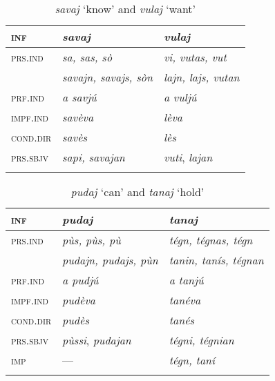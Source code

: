 \begin{table}
	\caption{\textit{savaj} `know' and \textit{vulaj} `want'}
	\label{}
	\begin{tabular}{lll}
		\lsptoprule
		\textsc{inf} & \textbf{\textit{savaj}} & \textbf{\textit{vulaj}} \\
		\midrule
		\textsc{prs.ind} & \textit{sa, sas, sò} & \textit{vi, vutas, vut} \\
		& \textit{savajn, savajs, sòn} & \textit{lajn, lajs, vutan} \\
		\textsc{prf.ind} & \textit{a savjú} & \textit{a vuljú}\\
		\textsc{impf.ind} & \textit{savèva} & \textit{lèva}\\
		\textsc{cond.dir} & \textit{savès} & \textit{lès}\\
		\textsc{prs.sbjv} & \textit{sapi, savajan} & \textit{vuti}, \textit{lajan}\\
		\lspbottomrule
	\end{tabular}
\end{table}


\begin{table}
	\caption{\textit{pudaj} `can' and \textit{tanaj} `hold'}
	\label{}
	\begin{tabular}{lll}
		\lsptoprule
		\textsc{inf} & \textit{\textbf{pudaj}} & \textbf{\textit{tanaj}}\\
		\midrule
		\textsc{prs.ind} & \textit{pùs, pùs, pù} & \textit{tégn, tégnas, tégn}\\
		& \textit{pudajn, pudajs, pùn} & \textit{tanin, tanís, tégnan}\\
		\textsc{prf.ind} & \textit{a pudjú} & \textit{a tanjú}\\
		\textsc{impf.ind} & \textit{pudèva} & \textit{tanéva}\\
		\textsc{cond.dir} & \textit{pudès} & \textit{tanés}\\
		\textsc{prs.sbjv} & \textit{pùssi}, \textit{pudajan} & \textit{tégni, tégnian}\\
		\textsc{imp} & --- & \textit{tégn, taní}\\\lspbottomrule
	\end{tabular}
\end{table}


